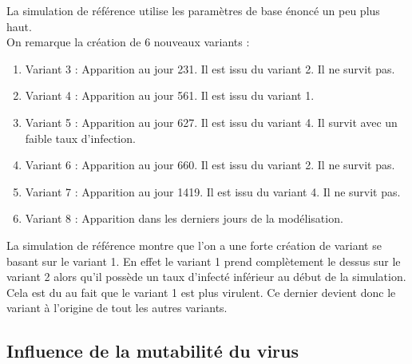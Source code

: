 \documentclass{article}
\begin{document}
\noindent
La simulation de référence utilise les paramètres de base énoncé un peu plus haut. \\
On remarque la création de 6 nouveaux variants : \\
\begin{enumerate}
    \item Variant 3 : Apparition au jour 231. Il est issu du variant 2. Il ne survit pas.
    \item Variant 4 : Apparition au jour 561. Il est issu du variant 1.
    \item Variant 5 : Apparition au jour 627. Il est issu du variant 4. Il survit avec un faible taux d'infection.
    \item Variant 6 : Apparition au jour 660. Il est issu du variant 2. Il ne survit pas.
    \item Variant 7 : Apparition au jour 1419. Il est issu du variant 4. Il ne survit pas.
    \item Variant 8 : Apparition dans les derniers jours de la modélisation.
\end{enumerate}
\noindent
La simulation de référence montre que l'on a une forte création de variant se basant sur le variant 1. En effet le variant 1 prend complètement le dessus sur le variant 2 alors qu'il possède un taux d'infecté inférieur au début de la simulation. Cela est du au fait que le variant 1 est plus virulent. Ce dernier devient donc le variant à l'origine de tout les autres variants.

\subsection{Influence de la mutabilité du virus}
\end{document}
